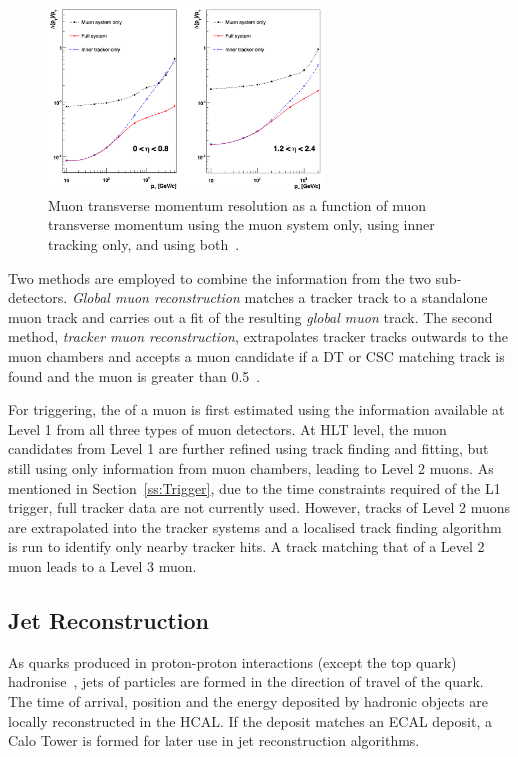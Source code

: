 \begin{figure}[hbtp]
   \centering
     \includegraphics[width=0.65\textwidth]{Chapters/02_Detector/Images/muon_momentum_resolution.png}\hfill
     \caption[Muon transverse momentum resolution using muon system and the tracking system.]{Muon transverse
     momentum resolution as a function of muon transverse momentum using the muon system only, using inner tracking only,
     and using both~\cite{Chatrchyan:2012xdj}.}
     \label{fig:muon_momentum_resolution}
\end{figure}

Two methods are employed to combine the information from the two sub-detectors. \textit{Global muon
reconstruction} matches a tracker track to a standalone muon track and carries out a fit of the resulting
\textit{global muon} track. The second method, \textit{tracker muon reconstruction}, extrapolates tracker
tracks outwards to the muon chambers and accepts a muon candidate if a DT or CSC matching track is found and
the muon \pt is greater than 0.5\GeV~\cite{muon_reconstruction}.

For triggering, the \pt of a muon is first estimated using the information available at Level 1 from all three
types of muon detectors. At HLT level, the muon candidates from Level 1 are further refined using track
finding and fitting, but still using only information from muon chambers, leading to Level 2 muons. As
mentioned in Section~\ref{ss:Trigger}, due to the time constraints required of the L1 trigger, full tracker
data are not currently used. However, tracks of Level 2 muons are extrapolated into the tracker systems and a
localised track finding algorithm is run to identify only nearby tracker hits. A track matching that of a
Level 2 muon leads to a Level 3 muon. %

\subsection{Jet Reconstruction}
\label{ss:jet_reconstruction}
As quarks produced in proton-proton interactions (except the top quark) hadronise~\cite{Griffiths:1987tj},
jets of particles are formed in the direction of travel of the quark. The time of arrival, position and the
energy deposited by hadronic objects are locally reconstructed in the HCAL. If the deposit matches an ECAL
deposit, a Calo Tower is formed for later use in jet reconstruction algorithms.

